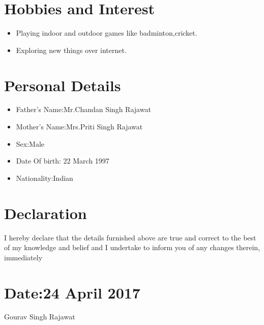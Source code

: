 \documentclass[11pt,a4paper]{article}
\begin{document}
\section*{Hobbies and Interest}
\vspace{-0.7em}\hline \vspace{1.5em}
\begin{itemize}
\item Playing indoor and outdoor games like badminton,cricket.
\item Exploring new things over internet.
\end{itemize}

\section*{Personal Details}
\vspace{-0.7em}\hline \vspace{1.5em}
\begin{itemize}
\item Father's Name:Mr.Chandan Singh Rajawat
\item Mother's Name:Mrs.Priti Singh Rajawat
\item Sex:Male
\item Date Of birth: 22 March 1997
\item Nationality:Indian
\end{itemize}

\section*{Declaration}
\vspace{-0.7em}\hline \vspace{1.5em}
I hereby declare that the details furnished above are true and correct to the best of my knowledge and belief and I undertake to inform you of any changes therein, immediately
\section*{\small Date:24 April 2017}
\begin{flushright}
\Large Gourav Singh Rajawat
\end{flushright}
\end{document}
